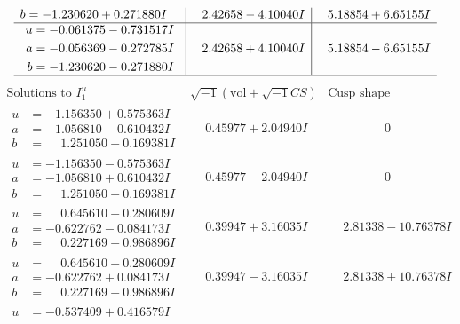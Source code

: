 \documentclass[1p]{elsarticle_modified}
\theoremstyle{definition}
\newcommand{\I}{\sqrt{-1}}
\begin{document}
$$\begin{array}{c|c|c}
\begin{aligned}
b &= -1.230620 + 0.271880 I\end{aligned}
 & \phantom{-}2.42658 - 4.10040 I & \phantom{-}5.18854 + 6.65155 I \\ \hline\begin{aligned}
u &= -0.061375 - 0.731517 I \\
a &= -0.056369 - 0.272785 I \\
b &= -1.230620 - 0.271880 I\end{aligned}
 & \phantom{-}2.42658 + 4.10040 I & \phantom{-}5.18854 - 6.65155 I\\
 \hline 
 \end{array}$$\newpage$$\begin{array}{c|c|c}  
\text{Solutions to }I^u_{1}& \I (\text{vol} + \sqrt{-1}CS) & \text{Cusp shape}\\
 \hline 
\begin{aligned}
u &= -1.156350 + 0.575363 I \\
a &= -1.056810 - 0.610432 I \\
b &= \phantom{-}1.251050 + 0.169381 I\end{aligned}
 & \phantom{-}0.45977 + 2.04940 I & \phantom{-0.000000 } 0 \\ \hline\begin{aligned}
u &= -1.156350 - 0.575363 I \\
a &= -1.056810 + 0.610432 I \\
b &= \phantom{-}1.251050 - 0.169381 I\end{aligned}
 & \phantom{-}0.45977 - 2.04940 I & \phantom{-0.000000 } 0 \\ \hline\begin{aligned}
u &= \phantom{-}0.645610 + 0.280609 I \\
a &= -0.622762 - 0.084173 I \\
b &= \phantom{-}0.227169 + 0.986896 I\end{aligned}
 & \phantom{-}0.39947 + 3.16035 I & \phantom{-}2.81338 - 10.76378 I \\ \hline\begin{aligned}
u &= \phantom{-}0.645610 - 0.280609 I \\
a &= -0.622762 + 0.084173 I \\
b &= \phantom{-}0.227169 - 0.986896 I\end{aligned}
 & \phantom{-}0.39947 - 3.16035 I & \phantom{-}2.81338 + 10.76378 I \\ \hline\begin{aligned}
u &= -0.537409 + 0.416579 I \\

\end{aligned}
\end{array}$$
\end{document}
